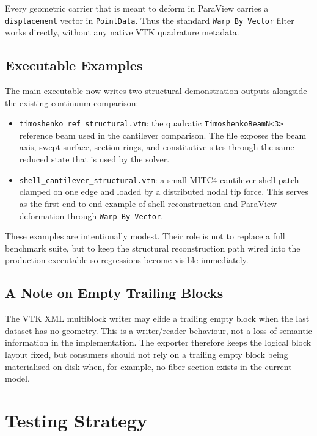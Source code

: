 Every geometric carrier that is meant to deform in ParaView carries a
\texttt{displacement} vector in \texttt{PointData}.  Thus the standard
\texttt{Warp By Vector} filter works directly, without any native VTK
quadrature metadata.

\subsection{Executable Examples}

The main executable now writes two structural demonstration outputs alongside
the existing continuum comparison:
\begin{itemize}
  \item \texttt{timoshenko\_ref\_structural.vtm}: the quadratic
        \texttt{TimoshenkoBeamN<3>} reference beam used in the cantilever
        comparison.  The file exposes the beam axis, swept surface, section
        rings, and constitutive sites through the same reduced state that is
        used by the solver.
  \item \texttt{shell\_cantilever\_structural.vtm}: a small MITC4 cantilever
        shell patch clamped on one edge and loaded by a distributed nodal tip
        force.  This serves as the first end-to-end example of shell
        reconstruction and ParaView deformation through \texttt{Warp By
        Vector}.
\end{itemize}

These examples are intentionally modest.  Their role is not to replace a full
benchmark suite, but to keep the structural reconstruction path wired into the
production executable so regressions become visible immediately.

\subsection{A Note on Empty Trailing Blocks}

The VTK XML multiblock writer may elide a trailing empty block when the last
dataset has no geometry.  This is a writer/reader behaviour, not a loss of
semantic information in the implementation.  The exporter therefore keeps the
logical block layout fixed, but consumers should not rely on a trailing empty
block being materialised on disk when, for example, no fiber section exists in
the current model.

\section{Testing Strategy}

